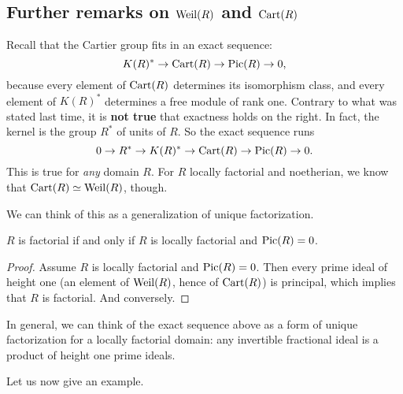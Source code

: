 \subsection{Further remarks on $\mathrm{Weil}(R)$ and $\mathrm{Cart}(R)$} Recall that the Cartier group fits in an exact sequence:
\[  K(R)^* \to \mathrm{Cart}(R) \to \mathrm{Pic}(R) \to 0,   \]
because every element of $\mathrm{Cart}(R)$ determines its isomorphism class, and
every element of $K(R)^*$ determines a free module of rank one. Contrary
to what was stated last time, it is \textbf{not true} that exactness holds on
the right. In fact, the kernel is the group $R^*$ of units of $R$. So the exact
sequence runs
\[ 0 \to R^* \to K(R)^* \to  \mathrm{Cart}(R) \to \mathrm{Pic}(R) \to 0.  \]
This is true for \emph{any} domain $R$. For $R$ locally factorial and
noetherian, we know that $\mathrm{Cart}(R) \simeq \mathrm{Weil}(R)$, though. 

We can think of this as a generalization of unique factorization. 
\begin{proposition} 
$R$ is factorial if and only if $R$ is locally factorial and $\mathrm{Pic}(R) = 0$.
\end{proposition} 
\begin{proof} 
Assume $R$ is locally factorial and $\mathrm{Pic}(R)=0$. Then every prime ideal of
height one (an element of $\mathrm{Weil}(R)$, hence of $\mathrm{Cart}(R)$) is principal, which
implies that $R$ is factorial. And conversely.
\end{proof} 

In general, we can think of the exact sequence above as a form of unique
factorization for a locally factorial domain: any invertible fractional ideal is a product of height one prime
ideals. 

Let us now give an example.


